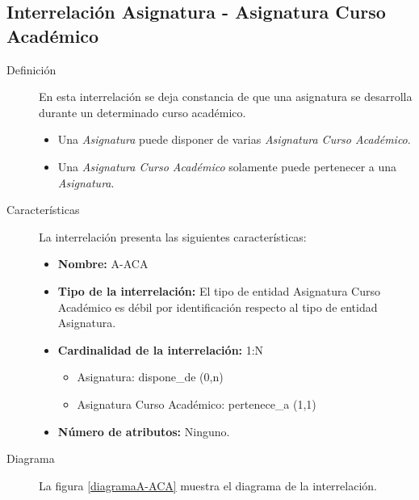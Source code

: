 \subsection{Interrelación Asignatura - Asignatura Curso Académico}

   \begin{description}
      \item[Definición] En esta interrelación se deja constancia de que una
      asignatura se desarrolla durante un determinado curso académico.

      \begin{itemize}
       \item Una \textit{Asignatura} puede disponer de varias \textit{Asignatura
             Curso Académico}.
       \item Una \textit{Asignatura Curso Académico} solamente puede pertenecer
             a una \textit{Asignatura}.
      \end{itemize}

      \item[Características] La interrelación presenta las siguientes
                             características:

         \begin{itemize}
            \item \textbf{Nombre:} A-ACA
            \item \textbf{Tipo de la interrelación:} El tipo de entidad
                  Asignatura Curso Académico es débil por identificación
                  respecto al tipo de entidad Asignatura.
            \item \textbf{Cardinalidad de la interrelación:} 1:N
                  \begin{itemize}
                     \item Asignatura: dispone\_de (0,n)
                     \item Asignatura Curso Académico: pertenece\_a (1,1)
                  \end{itemize}
            \item \textbf{Número de atributos:} Ninguno.
         \end{itemize}

      \item[Diagrama] La figura \ref{diagramaA-ACA} muestra el diagrama de la
                      interrelación.


\end{description}

